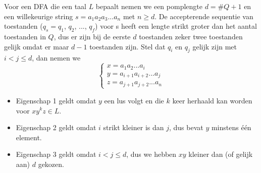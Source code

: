 Voor een DFA die een taal $L$ bepaalt nemen we een pomplengte $d = \#Q + 1$ en een willekeurige string $s = a_1a_2a_3...a_n$ met $n \geq d$. De accepterende sequentie van toestanden ($q_s = q_1$, $q_2$, ..., $q_f$) voor s heeft een lengte strikt groter dan het aantal toestanden in $Q$, dus er zijn bij de eerste $d$ toestanden zeker twee toestanden gelijk omdat er maar $d-1$ toestanden zijn. Stel dat $q_i$ en $q_j$ gelijk zijn met $i < j \leq d$, dan nemen we
  \begin{equation*}
  \begin{cases}
  x = a_1a_2...a_i\\
  y = a_{i+1}a_{i+2}...a_j\\
  z = a_{j+1}a_{j+2}...a_n
  \end{cases}
  \end{equation*}
  \begin{itemize}
  \item Eigenschap 1 geldt omdat $y$ een lus volgt en die $k$ keer herhaald kan worden voor $xy^kz \in L$.
  \item Eigenschap 2 geldt omdat $i$ strikt kleiner is dan $j$, dus bevat $y$ minstens \'e\'en element.
  \item Eigenschap 3 geldt omdat $i < j \leq d$, dus we hebben $xy$ kleiner dan (of gelijk aan) $d$ gekozen.
  \end{itemize}